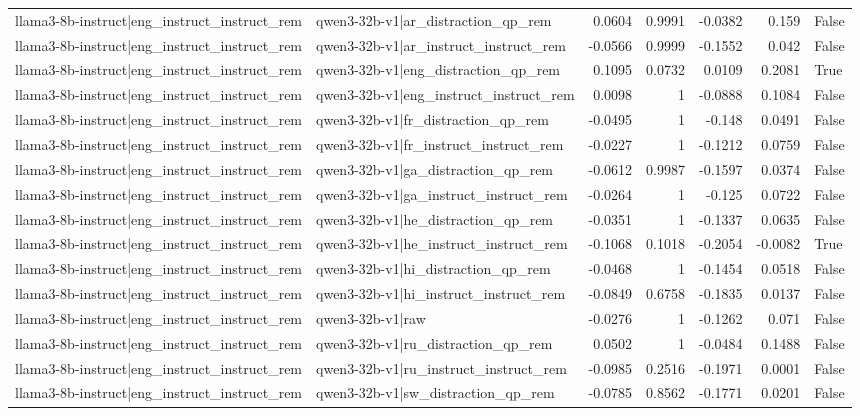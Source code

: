 \begin{table}
\begin{tabular}{l l r r r r l}
llama3-8b-instruct|eng_instruct_instruct_rem & qwen3-32b-v1|ar_distraction_qp_rem & 0.0604 & 0.9991 & -0.0382 & 0.159 & False \\
llama3-8b-instruct|eng_instruct_instruct_rem & qwen3-32b-v1|ar_instruct_instruct_rem & -0.0566 & 0.9999 & -0.1552 & 0.042 & False \\
llama3-8b-instruct|eng_instruct_instruct_rem & qwen3-32b-v1|eng_distraction_qp_rem & 0.1095 & 0.0732 & 0.0109 & 0.2081 & True \\
llama3-8b-instruct|eng_instruct_instruct_rem & qwen3-32b-v1|eng_instruct_instruct_rem & 0.0098 & 1 & -0.0888 & 0.1084 & False \\
llama3-8b-instruct|eng_instruct_instruct_rem & qwen3-32b-v1|fr_distraction_qp_rem & -0.0495 & 1 & -0.148 & 0.0491 & False \\
llama3-8b-instruct|eng_instruct_instruct_rem & qwen3-32b-v1|fr_instruct_instruct_rem & -0.0227 & 1 & -0.1212 & 0.0759 & False \\
llama3-8b-instruct|eng_instruct_instruct_rem & qwen3-32b-v1|ga_distraction_qp_rem & -0.0612 & 0.9987 & -0.1597 & 0.0374 & False \\
llama3-8b-instruct|eng_instruct_instruct_rem & qwen3-32b-v1|ga_instruct_instruct_rem & -0.0264 & 1 & -0.125 & 0.0722 & False \\
llama3-8b-instruct|eng_instruct_instruct_rem & qwen3-32b-v1|he_distraction_qp_rem & -0.0351 & 1 & -0.1337 & 0.0635 & False \\
llama3-8b-instruct|eng_instruct_instruct_rem & qwen3-32b-v1|he_instruct_instruct_rem & -0.1068 & 0.1018 & -0.2054 & -0.0082 & True \\
llama3-8b-instruct|eng_instruct_instruct_rem & qwen3-32b-v1|hi_distraction_qp_rem & -0.0468 & 1 & -0.1454 & 0.0518 & False \\
llama3-8b-instruct|eng_instruct_instruct_rem & qwen3-32b-v1|hi_instruct_instruct_rem & -0.0849 & 0.6758 & -0.1835 & 0.0137 & False \\
llama3-8b-instruct|eng_instruct_instruct_rem & qwen3-32b-v1|raw & -0.0276 & 1 & -0.1262 & 0.071 & False \\
llama3-8b-instruct|eng_instruct_instruct_rem & qwen3-32b-v1|ru_distraction_qp_rem & 0.0502 & 1 & -0.0484 & 0.1488 & False \\
llama3-8b-instruct|eng_instruct_instruct_rem & qwen3-32b-v1|ru_instruct_instruct_rem & -0.0985 & 0.2516 & -0.1971 & 0.0001 & False \\
llama3-8b-instruct|eng_instruct_instruct_rem & qwen3-32b-v1|sw_distraction_qp_rem & -0.0785 & 0.8562 & -0.1771 & 0.0201 & False \\

\end{tabular}
\end{table}
